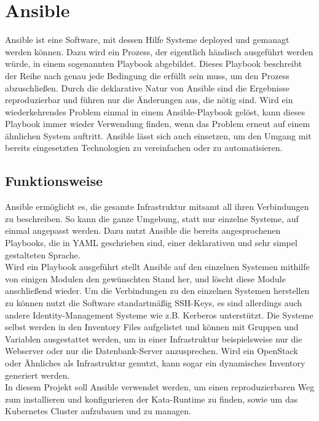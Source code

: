 


\section{Ansible}
Ansible ist eine Software, mit dessen Hilfe Systeme deployed und gemanagt werden können. 
Dazu wird ein Prozess, der eigentlich händisch ausgeführt werden würde, in einem sogenannten Playbook abgebildet.
Dieses Playbook beschreibt der Reihe nach genau jede Bedingung die erfüllt sein muss, um den Prozess abzuschließen.
Durch die deklarative Natur von Ansible sind die Ergebnisse reproduzierbar und führen nur die Änderungen aus, die nötig sind.
Wird ein wiederkehrendes Problem einmal in einem Ansible-Playbook gelöst, kann dieses Playbook immer wieder Verwendung finden, wenn das Problem erneut auf einem ähnlichen System auftritt.
Ansible lässt sich auch einsetzen, um den Umgang mit bereits eingesetzten Technologien zu vereinfachen oder zu automatisieren.
\cite{ansible}

\subsection{Funktionsweise}
Ansible ermöglicht es, die gesamte Infrastruktur mitsamt all ihren Verbindungen zu beschreiben. 
So kann die ganze Umgebung, statt nur einzelne Systeme, auf einmal angepasst werden.
Dazu nutzt Ansible die bereits angesprochenen Playbooks, die in \ac{YAML} geschrieben sind, einer deklarativen und sehr simpel gestalteten Sprache.
\\
Wird ein Playbook ausgeführt stellt Ansible auf den einzelnen Systemen mithilfe von einigen Modulen den gewünschten Stand her, und löscht diese Module anschließend wieder. 
Um die Verbindungen zu den einzelnen Systemen herstellen zu können nutzt die Software standartmäßig \ac{SSH}-Keys, es sind allerdings auch andere Identity-Management Systeme wie z.B. Kerberos unterstützt.
Die Systeme selbst werden in den Inventory Files aufgelistet und können mit Gruppen und Variablen ausgestattet werden, um in einer Infrastruktur beispielsweise nur die Webserver oder nur die Datenbank-Server anzusprechen.
Wird ein OpenStack oder Ähnliches als Infrastruktur genutzt, kann sogar ein dynamisches Inventory generiert werden.
\cite{how_ansible_works}
\\
In diesem Projekt soll Ansible verwendet werden, um einen reproduzierbaren Weg zum installieren und konfigurieren der Kata-Runtime zu finden, sowie um das Kubernetes Cluster aufzubauen und zu managen. 


